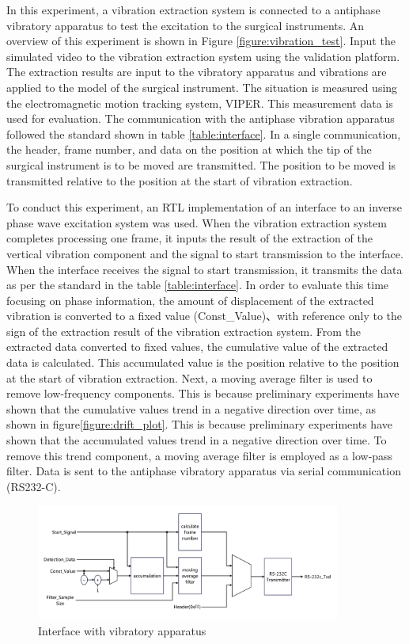 In this experiment, a vibration extraction system is connected
to a antiphase vibratory apparatus to test the excitation to the surgical instruments.
An overview of this experiment is shown in Figure \ref{figure:vibration_test}.
Input the simulated video to the vibration extraction system using the validation platform.
The extraction results are input to the vibratory apparatus and vibrations are applied to the model of the surgical instrument.
The situation is measured using the electromagnetic motion tracking system, VIPER\cite{bib:VIPER}.
This measurement data is used for evaluation.
The communication with the antiphase vibration apparatus followed the
standard shown in table \ref{table:interface}.
In a single communication, the header, frame number,
and data on the position at which the tip of the surgical instrument is
to be moved are transmitted.
The position to be moved is transmitted relative to the position
at the start of vibration extraction.

To conduct this experiment, an RTL implementation of an interface
to an inverse phase wave excitation system was used.
When the vibration extraction system completes processing one frame,
it inputs the result of the extraction of the vertical vibration
component and the signal to start transmission to the interface.
When the interface receives the signal to start transmission,
it transmits the data as per the standard in the table \ref{table:interface}.
In order to evaluate this time focusing on phase information, the amount of displacement of the extracted vibration is converted to a fixed value (Const\_Value)、with reference only to the sign of
the extraction result of the vibration extraction system.
From the extracted data converted to fixed values,
the cumulative value of the extracted data is calculated.
This accumulated value is the position relative to the position at the start of vibration extraction.
Next, a moving average filter is used to remove low-frequency components.
This is because preliminary experiments have shown that the cumulative values trend
in a negative direction over time, as shown in figure\ref{figure:drift_plot}.
This is because preliminary experiments have shown that the accumulated values trend
in a negative direction over time.
To remove this trend component, a moving average filter is employed as a low-pass filter.
Data is sent to the antiphase vibratory apparatus via serial communication (RS232-C).


\begin{figure}[tb]
  \centering
  \includegraphics[width = 10cm,pagebox=cropbox,clip]{img/interface.pdf}
  \caption{Interface with vibratory apparatus}
  \label{figure:interface}
\end{figure}

